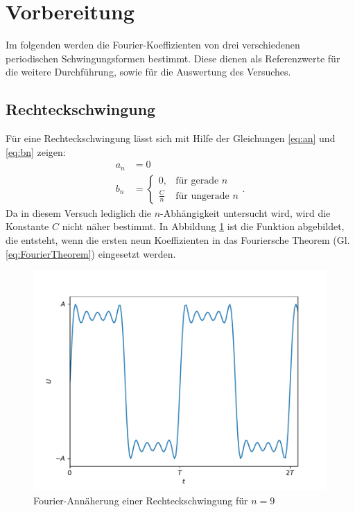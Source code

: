 \section{Vorbereitung}
Im folgenden werden die Fourier-Koeffizienten von drei verschiedenen periodischen Schwingungsformen bestimmt. Diese dienen als Referenzwerte für die weitere Durchführung, sowie für die Auswertung des Versuches.
\subsection{Rechteckschwingung}
Für eine Rechteckschwingung lässt sich mit Hilfe der Gleichungen \eqref{eq:an} und \eqref{eq:bn} zeigen:
\begin{align*}
    a_n &= 0 \\
    b_n &= 
    \begin{cases}
    0 ,     & \text {für gerade $n$} \\
    \frac{C}{n} & \text {für ungerade $n$}
    \end{cases} .
\end{align*}
Da in diesem Versuch lediglich die $n$-Abhängigkeit untersucht wird, wird die Konstante $C$ nicht näher bestimmt. In Abbildung \ref{fig:vorbereitung_rechteck} ist die Funktion abgebildet, die entsteht, wenn die ersten neun Koeffizienten in das Fouriersche Theorem (Gl. \eqref{eq:FourierTheorem}) eingesetzt werden.
\begin{figure}[h]
  \centering
  \includegraphics[width=\textwidth]{assets/fourier_rechteck.pdf}
  \caption{Fourier-Annäherung einer Rechteckschwingung für $n=9$}
  \label{fig:vorbereitung_rechteck}
\end{figure}
